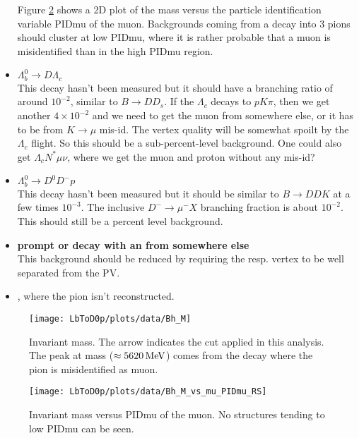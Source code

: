 \begin{itemize}
      Figure \ref{fig:plot_D0pmuMass_vs_muPIDmu} shows a 2D plot of the \Dz\proton\muon mass versus the particle identification variable PIDmu of the muon. 
      Backgrounds coming from a \Lb decay into 3 pions should cluster at low PIDmu, where it is rather probable that a muon is misidentified than in the high PIDmu region.
\item {\bf $\Lambda_b^0 \rightarrow D \Lambda_c$}\\
      This decay hasn't been measured but it should have a branching ratio of around $10^{-2}$, similar to $B \rightarrow D D_s$.
      If the $\Lambda_c$ decays to $pK\pi$, then we get another $4 \times 10^{-2}$ and we need to get the muon from somewhere else, 
      or it has to be from $K \rightarrow \mu$ mis-id. 
      The vertex quality will be somewhat spoilt by the $\Lambda_c$ flight.
      So this should be a sub-percent-level background.
      One could also get $\Lambda_c N^* \mu \nu$, where we get the muon and proton without any mis-id?
\item {\bf $\Lambda_b^0 \rightarrow D^0 D^- p$}\\
This decay hasn't been measured but it should be similar to $B \rightarrow DDK$ at a few times $10^{-3}$.
The inclusive $D^- \rightarrow \mu^-X$ branching fraction is about $10^{-2}$.
This should still be a percent level background.
\item {\bf prompt \LcResI or \LcResII decay with an \mun from somewhere else} \\
This background should be reduced by requiring the \LcResI resp. \LcResII vertex to be well separated from the PV.
\item \textbf{ \decay{\SigmabRes}{\Lb \pi}}, where the pion isn't reconstructed.
\end{itemize}

\begin{figure}[hptb]
	\centering
	\texttt{[image: LbToD0p/plots/data/Bh\_M]}
	\caption{Invariant \Dz\proton\mun mass. The arrow indicates the cut applied in this analysis. The peak at \Lb mass ($\approx 5620 \mathrm{\,Me\kern -0.1em V}$) comes from the decay \decay{\Lb}{\Dz\proton\pi} where the pion is misidentified as muon.}
	\label{fig:plot_D0pmuMass}
\end{figure}

\begin{figure}[hptb]
	\centering
	\texttt{[image: LbToD0p/plots/data/Bh\_M\_vs\_mu\_PIDmu\_RS]}
	\caption{Invariant \Dz\proton\mun mass versus PIDmu of the muon. No structures tending to low PIDmu can be seen.}
	\label{fig:plot_D0pmuMass_vs_muPIDmu}
\end{figure}

